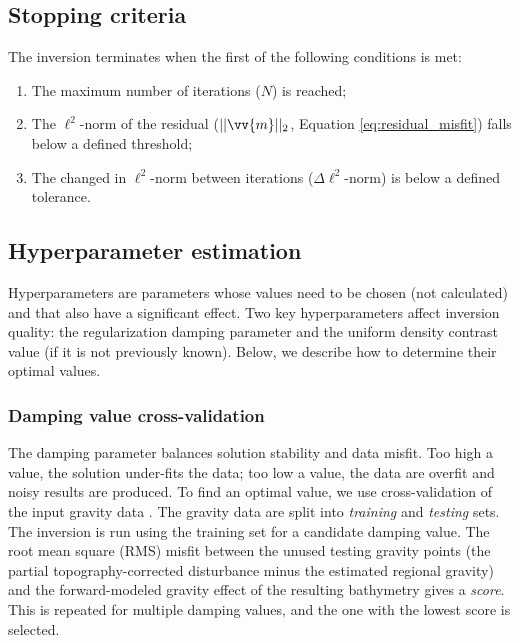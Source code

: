 \documentclass[tc, manuscript]{copernicus}
\begin{document}
\subsection{Stopping criteria}

The inversion terminates when the first of the following conditions is met:

\begin{enumerate}
    \item The maximum number of iterations ($N$) is reached;
    \item The $\ell^2$-norm of the residual ($||\vv{m}||_2$, Equation \ref{eq:residual_misfit}) falls below a defined threshold;
    \item The changed in $\ell^2$-norm between iterations ($\Delta\ell^2$-norm) is below a defined tolerance.
\end{enumerate}

\subsection{Hyperparameter estimation}\label{hyperparameters}

Hyperparameters are parameters whose values need to be chosen (not calculated) and that also have a significant effect. Two key hyperparameters affect inversion quality: the regularization damping parameter and the uniform density contrast value (if it is not previously known). Below, we describe how to determine their optimal values.

\subsubsection{Damping value cross-validation}
The damping parameter balances solution stability and data misfit. Too high a value, the solution under-fits the data; too low a value, the data are overfit and noisy results are produced. To find an optimal value, we use cross-validation of the input gravity data \citep[Figure \ref{fig:hyperparameters}a;][]{uiedafast2017}. The gravity data are split into \textit{training} and \textit{testing} sets. The inversion is run using the training set for a candidate damping value. The root mean square (RMS) misfit between the unused testing gravity points (the partial topography-corrected disturbance minus the estimated regional gravity) and the forward-modeled gravity effect of the resulting bathymetry gives a \textit{score}. This is repeated for multiple damping values, and the one with the lowest score is selected.
\end{document}
